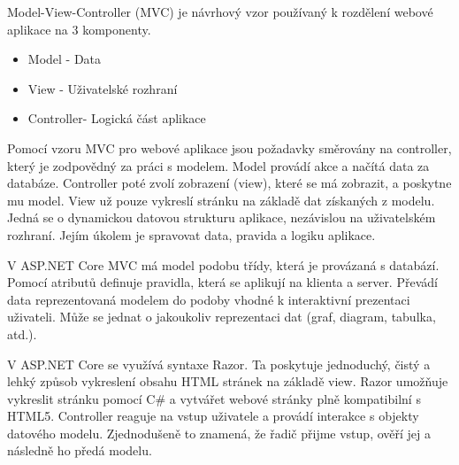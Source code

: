 \documentclass[a4paper, 12pt]{report}
\begin{document}
		Model-View-Controller (MVC) je návrhový vzor používaný k rozdělení webové aplikace na 3 komponenty.
		\begin{itemize}
			\item Model - Data
			\item View - Uživatelské rozhraní
			\item Controller- Logická část aplikace
		\end{itemize}
		Pomocí vzoru MVC pro webové aplikace jsou požadavky směrovány na controller, který je zodpovědný za práci s modelem. Model provádí akce a načítá data za databáze. Controller poté zvolí zobrazení (view), které se má zobrazit, a poskytne mu model. View už pouze vykreslí stránku na základě dat získaných z modelu.
		\cite{MVC}
				Jedná se o dynamickou datovou strukturu aplikace, nezávislou na uživatelském rozhraní. Jejím úkolem je spravovat data, pravida a logiku aplikace. \par
				V ASP.NET Core MVC má model podobu třídy, která je provázaná s databází. Pomocí atributů definuje pravidla, která se aplikují na klienta a server.
				\cite{MVC_Wiki_EN}
				Převádí data reprezentovaná modelem do podoby vhodné k interaktivní prezentaci uživateli.\cite{MVC_Wiki_CZ} Může se jednat o jakoukoliv reprezentaci dat (graf, diagram, tabulka, atd.). \par
				V ASP.NET Core se využívá syntaxe Razor. Ta poskytuje jednoduchý, čistý a lehký způsob vykreslení obsahu HTML stránek na základě view. Razor umožňuje vykreslit stránku pomocí C\# a vytvářet webové stránky plně kompatibilní s HTML5.
				\cite{MVC_Wiki_EN}
				Controller reaguje na vstup uživatele a provádí interakce s objekty datového modelu. Zjednodušeně to znamená, že řadič přijme vstup, ověří jej a následně ho předá modelu.
				\cite{MVC_Wiki_EN}



	\seznamTabulek
	
	\seznamObrazku
	

	
	

\end{document}
